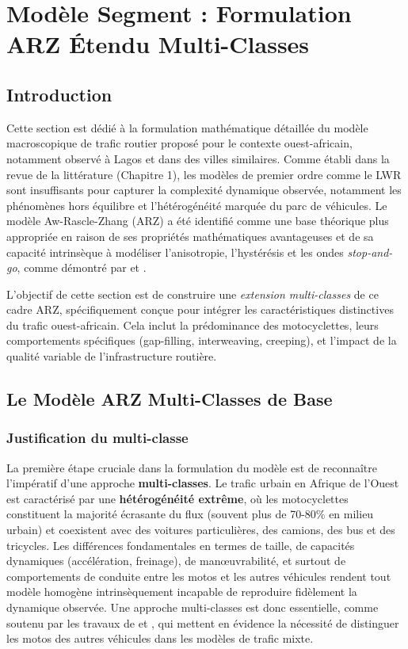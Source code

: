 \section{Modèle Segment : Formulation ARZ Étendu Multi-Classes}
\label{sec:formulation_modele}

\subsection{Introduction}
Cette section est dédié à la formulation mathématique détaillée du modèle macroscopique de trafic routier proposé pour le contexte ouest-africain, notamment observé à Lagos et dans des villes similaires. Comme établi dans la revue de la littérature (Chapitre 1), les modèles de premier ordre comme le LWR sont insuffisants pour capturer la complexité dynamique observée, notamment les phénomènes hors équilibre et l'hétérogénéité marquée du parc de véhicules. Le modèle Aw-Rascle-Zhang (ARZ) a été identifié comme une base théorique plus appropriée en raison de ses propriétés mathématiques avantageuses et de sa capacité intrinsèque à modéliser l'anisotropie, l'hystérésis et les ondes \textit{stop-and-go}, comme démontré par \cite{Aw2000} et \cite{Zhang2002}.

L'objectif de cette section est de construire une \textit{extension multi-classes} de ce cadre ARZ, spécifiquement conçue pour intégrer les caractéristiques distinctives du trafic ouest-africain. Cela inclut la prédominance des motocyclettes, leurs comportements spécifiques (gap-filling, interweaving, creeping), et l'impact de la qualité variable de l'infrastructure routière.

\subsection{Le Modèle ARZ Multi-Classes de Base}
\subsubsection{Justification du multi-classe}
La première étape cruciale dans la formulation du modèle est de reconnaître l'impératif d'une approche \textbf{multi-classes}. Le trafic urbain en Afrique de l'Ouest est caractérisé par une \textbf{hétérogénéité extrême}, où les motocyclettes constituent la majorité écrasante du flux (souvent plus de 70-80\% en milieu urbain) et coexistent avec des voitures particulières, des camions, des bus et des tricycles. Les différences fondamentales en termes de taille, de capacités dynamiques (accélération, freinage), de manœuvrabilité, et surtout de comportements de conduite entre les motos et les autres véhicules rendent tout modèle homogène intrinsèquement incapable de reproduire fidèlement la dynamique observée. Une approche multi-classes est donc essentielle, comme soutenu par les travaux de \cite{Lee2008} et \cite{Meng2007}, qui mettent en évidence la nécessité de distinguer les motos des autres véhicules dans les modèles de trafic mixte.

